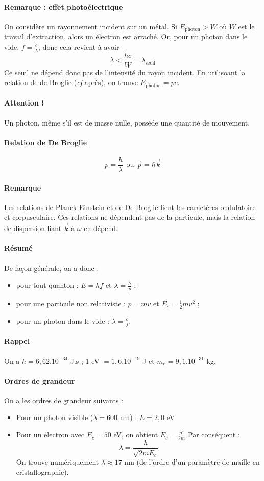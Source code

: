 \documentclass[french]{book}
\theoremstyle{plain}
\theoremstyle{definition}
\theoremstyle{remark}
\begin{document}
\paragraph{Remarque : effet photoélectrique} On considère un rayonnement incident sur un métal. Si $E_\text{photon}>W$ où $W$ est le travail d'extraction, alors un électron est arraché. Or, pour un photon dans le vide, $f=\displaystyle\frac{c}{\lambda}$, donc cela revient à avoir $$\lambda <\frac{hc}{W}=\lambda_\text{seuil}$$ Ce seuil ne dépend donc pas de l'intensité du rayon incident. En utilisoant la relation de de Broglie (\textit{cf} après), on trouve $E_\text{photon}=pc$.
\paragraph{Attention !} Un photon, même s'il est de masse nulle, possède une quantité de mouvement.
\paragraph{Relation de De Broglie} $$p=\frac{h}{\lambda} \ \ \text{ou} \ \ \overrightarrow{p}=\hbar\overrightarrow{k}$$
\paragraph{Remarque} Les relations de Planck-Einstein et de De Broglie lient les caractères ondulatoire et corpusculaire. Ces relations ne dépendent pas de la particule, mais la relation de dispersion liant $\overrightarrow{k}$ à $\omega$ en dépend.
\paragraph{Résumé} De façon générale, on a donc :
\begin{itemize}
	\item pour tout quanton : $E=hf$ et $\lambda=\displaystyle\frac{h}{p}$ ;
	\item pour une particule non relativiste : $p=mv$ et $E_c=\displaystyle\frac12 mv^2$ ;
	\item pour un photon dans le vide : $\displaystyle\lambda=\frac{c}{f}$.
\end{itemize}
\paragraph{Rappel} On a $h=6,62.10^{-34}$ J.s ; $1$ eV $=1,6.10^{-19}$ J et $m_e=9,1.10^{-31}$ kg.
\paragraph{Ordres de grandeur} On a les ordres de grandeur suivants :
\begin{itemize}
	\item Pour un photon visible ($\lambda=600$ nm) : $E=2,0$ eV
	\item Pour un électron avec $E_c=50$ eV, on obtient $E_c=\displaystyle\frac{p^2}{2m}$ Par conséquent : $$\lambda=\frac{h}{\sqrt{2mE_c}}$$ On trouve numériquement $\lambda\approx 17$ nm (de l'ordre d'un paramètre de maille en cristallographie).
\end{itemize}
\end{document}
